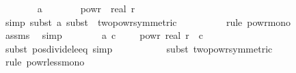 \begin{isabellebody}
\isanewline
\ \ \ \ \ \ \isamarkupfalse%
\ a{\isacharunderscore}{\kern0pt}{}{\isacharunderscore}{\kern0pt}{}{\isacharcolon}{\kern0pt}\ {\isachardoublequoteopen}{}\ {\isasymle}\ {}\ {\isacharasterisk}{\kern0pt}\ {\isacharparenleft}{\kern0pt}{}\ {\isacharminus}{\kern0pt}\ {}\ powr\ {\isacharparenleft}{\kern0pt}{\isacharminus}{\kern0pt}\ real\ r{\isacharparenright}{\kern0pt}{\isacharparenright}{\kern0pt}{\isachardoublequoteclose}\isanewline
\ \ \ \ \ \ \ \ \isamarkupfalse%
\ {\isacharparenleft}{\kern0pt}simp{\isacharcomma}{\kern0pt}\ subst\ a{\isacharunderscore}{\kern0pt}{}{\isacharcomma}{\kern0pt}\ subst\ {\isacharparenleft}{\kern0pt}{}{\isacharparenright}{\kern0pt}\ two{\isacharunderscore}{\kern0pt}powr{\isacharunderscore}{\kern0pt}{}{\isacharbrackleft}{\kern0pt}symmetric{\isacharbrackright}{\kern0pt}{\isacharparenright}{\kern0pt}\isanewline
\ \ \ \ \ \ \ \ \isamarkupfalse%
\ {\isacharparenleft}{\kern0pt}rule\ powr{\isacharunderscore}{\kern0pt}mono{\isacharparenright}{\kern0pt}\isanewline
\ \ \ \ \ \ \ \ \isamarkupfalse%
\ assms{\isacharparenleft}{\kern0pt}{}{\isacharparenright}{\kern0pt}\ \isamarkupfalse%
\ simp{\isacharplus}{\kern0pt}\isanewline
\isanewline
\ \ \ \ \ \ \isamarkupfalse%
\ a{\isacharunderscore}{\kern0pt}{}{\isacharcolon}{\kern0pt}\ {\isachardoublequoteopen}{\isacharparenleft}{\kern0pt}c{\isacharasterisk}{\kern0pt}{}{\isacharparenright}{\kern0pt}\ {\isacharslash}{\kern0pt}\ {\isacharparenleft}{\kern0pt}{}\ {\isacharminus}{\kern0pt}\ {}\ powr\ {\isacharparenleft}{\kern0pt}{\isacharminus}{\kern0pt}real\ r{\isacharparenright}{\kern0pt}{\isacharparenright}{\kern0pt}\ {\isasymle}\ c\ {\isacharasterisk}{\kern0pt}\ {}{\isachardoublequoteclose}\ \isanewline
\ \ \ \ \ \ \ \ \isamarkupfalse%
\ {\isacharparenleft}{\kern0pt}subst\ pos{\isacharunderscore}{\kern0pt}divide{\isacharunderscore}{\kern0pt}le{\isacharunderscore}{\kern0pt}eq{\isacharcomma}{\kern0pt}\ simp{\isacharparenright}{\kern0pt}\isanewline
\ \ \ \ \ \ \ \ \ \isamarkupfalse%
\ {\isacharparenleft}{\kern0pt}subst\ two{\isacharunderscore}{\kern0pt}powr{\isacharunderscore}{\kern0pt}{}{\isacharbrackleft}{\kern0pt}symmetric{\isacharbrackright}{\kern0pt}{\isacharparenright}{\kern0pt}\isanewline
\ \ \ \ \ \ \ \ \ \isamarkupfalse%
\ {\isacharparenleft}{\kern0pt}rule\ powr{\isacharunderscore}{\kern0pt}less{\isacharunderscore}{\kern0pt}mono{\isacharparenright}{\kern0pt}\ \isamarkupfalse%

\end{isabellebody}
